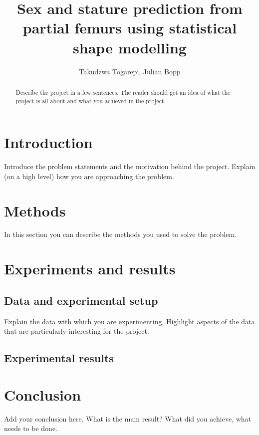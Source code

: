 \documentclass[10pt]{article}
\author{Takudzwa Togarepi, Julian Bopp }
\title{Sex and stature prediction from partial femurs using statistical shape modelling}
\begin{document}
\maketitle
\begin{abstract}
    Describe the project in a few sentences. 
    The reader should get an idea of what the project is all about
   and what you achieved in the project.
\end{abstract}

\section{Introduction}

Introduce the problem statements and the motivation behind the project.
Explain (on a high level) how you are approaching the problem. 

\section{Methods}

In this section you can describe the methods you used to solve the problem.


\section{Experiments and results}

\subsection{Data and experimental setup}

Explain the data with which you are experimenting.
Highlight aspects of the data that are particularly interesting 
for the project. 

\subsection{Experimental results}


\section{Conclusion}

Add your conclusion here. What is the main result? What did you achieve, what 
needs to be done. 
\end{document}
